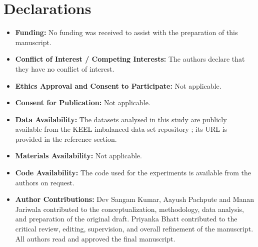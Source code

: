 \clearpage
\section*{Declarations}
\begin{itemize}
\item \textbf{Funding:} No funding was received to assist with the preparation of this manuscript.
\item \textbf{Conflict of Interest / Competing Interests:} The authors declare that they have no conflict of interest.
\item \textbf{Ethics Approval and Consent to Participate:} Not applicable.
\item \textbf{Consent for Publication:} Not applicable.
\item \textbf{Data Availability:} The datasets analysed in this study are publicly available from the KEEL imbalanced data-set repository \cite{alcala2011keel}; its URL is provided in the reference section.
\item \textbf{Materials Availability:} Not applicable.
\item \textbf{Code Availability:} The code used for the experiments is available from the authors on request.
\item \textbf{Author Contributions:} Dev Sangam Kumar, Aayush Pachpute and Manan Jariwala contributed to the conceptualization, methodology, data analysis, and preparation of the original draft. Priyanka Bhatt contributed to the critical review, editing, supervision, and overall refinement of the manuscript. All authors read and approved the final manuscript.
\end{itemize}
